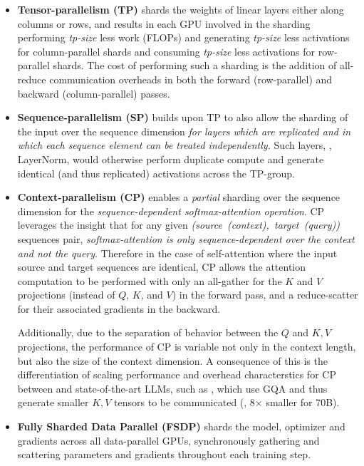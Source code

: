 \begin{itemize}
  \item \textbf{Tensor-parallelism (TP)} shards the weights of linear layers either along columns or rows, and results in each GPU involved in the sharding performing \textit{tp-size} less work (FLOPs) and generating \textit{tp-size} less activations for column-parallel shards and consuming \textit{tp-size} less activations for row-parallel shards. The cost of performing such a sharding is the addition of all-reduce communication overheads in both the forward (row-parallel) and backward (column-parallel) passes.

  \item \textbf{Sequence-parallelism (SP)} builds upon TP to also allow the sharding of the input over the sequence dimension \textit{for layers which are replicated and in which each sequence element can be treated independently.} Such layers, \eg, LayerNorm, would otherwise perform duplicate compute and generate identical (and thus replicated) activations across the TP-group.

  \item \textbf{Context-parallelism (CP)} enables a \textit{partial} sharding over the sequence dimension for the \textit{sequence-dependent softmax-attention operation}. CP leverages the insight that for any given \mbox{\textit{(source (context), target (query))}} sequences pair, \textit{softmax-attention is only sequence-dependent over the context and not the query}. Therefore in the case of self-attention where the input source and target sequences are identical, CP allows the attention computation to be performed with only an all-gather for the $K$ and $V$ projections (instead of $Q$, $K$, and $V$) in the forward pass, and a reduce-scatter for their associated gradients in the backward.

  Additionally, due to the separation of behavior between the $Q$ and $K,V$ projections, the performance of CP is variable not only in the context length, but also the size of the context dimension.
  A consequence of this is the differentiation of scaling performance and overhead characterstics for CP between \OursVideo and state-of-the-art LLMs, such as \llama, which use GQA and thus generate smaller $K,V$ tensors to be communicated (\eg, 8$\times$ smaller for \llama 70B).

  \item \textbf{Fully Sharded Data Parallel (FSDP)} shards the model, optimizer and gradients across all data-parallel GPUs, synchronously gathering and scattering parameters and gradients throughout each training step.
\end{itemize}


